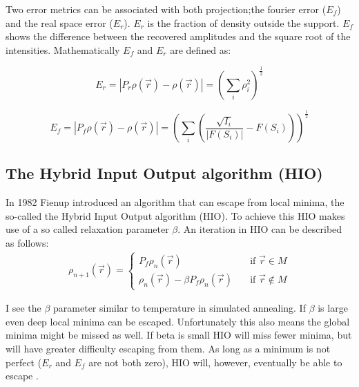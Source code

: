 Two error metrics can be associated with both projection;the fourier error ($E_f$) and the real space error ($E_r$). $E_r$ is the fraction of density outside the support. $E_f$ shows the difference between the recovered amplitudes and the square root of the intensities. Mathematically $E_f$ and $E_r$ are defined as:

\begin{equation}
E_r = \left|P_r\rho(\vec{r}) - \rho(\vec{r})\right| = \left(\sum_i\rho_i^2\right)^{\frac{1}{2}}
\end{equation}

\begin{equation}
E_f = \left|P_f\rho(\vec{r}) - \rho(\vec{r})\right| = \left(\sum_{i}\left(\frac{\sqrt{I_i}}{|F(S_i)|}- F(S_i)\right)\right)^{\frac{1}{2}}
\end{equation}
  
\subsection{The Hybrid Input Output algorithm (HIO)}
In 1982 Fienup introduced an algorithm that can escape from local minima, the so-called the Hybrid Input Output algorithm (HIO). To achieve this HIO makes use of a so called relaxation parameter $\beta$. An iteration in HIO can be described as follows:
\begin{align}
\rho_{n+1}\left(\vec{r}\right) = \begin{cases} P_f \rho_{n}\left(\vec{r}\right) \quad &\mathrm{if}\,\,
    \vec{r} \in M\\\rho_n(\vec{r}) -\beta P_f \rho_n(\vec{r}) \quad & \mathrm{if}\,\, \vec{r} \not\in M \end{cases}
\end{align}

I see the $\beta$ parameter similar to temperature in simulated annealing. If $\beta$ is large even deep local minima can be escaped. Unfortunately this also means the global minima might be missed as well. If beta is small HIO will miss fewer minima, but will have greater difficulty escaping from them. As long as a minimum is not perfect ($E_r$ and $E_f$ are not both zero), HIO will, however, eventually be able to escape \cite{Martin2010}.

